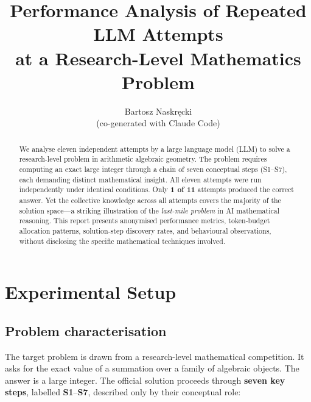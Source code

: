 \documentclass[11pt,a4paper]{article}
\title{%
  \textbf{Performance Analysis of Repeated LLM Attempts\\
  at a Research-Level Mathematics Problem}
}
\author{Bartosz Naskr\k{e}cki\\
  {\normalfont\small (co-generated with Claude Code)}}
\date{}
\begin{document}
\maketitle

\begin{abstract}
We analyse eleven independent attempts by a large language model
(LLM) to solve a research-level problem in arithmetic algebraic
geometry. The problem requires computing an exact large integer
through a chain of seven conceptual steps (S1--S7), each demanding
distinct mathematical insight. All eleven attempts were run
independently under identical conditions. Only \textbf{1 of 11}
attempts produced
the correct answer. Yet the collective knowledge across all
attempts covers the majority of the solution space---a striking
illustration of the \emph{last-mile problem} in AI mathematical
reasoning. This report presents anonymised performance metrics,
token-budget allocation patterns, solution-step discovery rates,
and behavioural observations, without disclosing the specific
mathematical techniques involved.
\end{abstract}

\smallskip
{}

\tableofcontents

\section{Experimental Setup}\label{sec:setup}

\subsection{Problem characterisation}

The target problem is drawn from a research-level mathematical
competition. It asks for the exact value of a summation over a
family of algebraic objects. The answer is a large integer. The official
solution proceeds through \textbf{seven key steps}, labelled
\textbf{S1}--\textbf{S7}, described only by their conceptual role:
\end{document}

